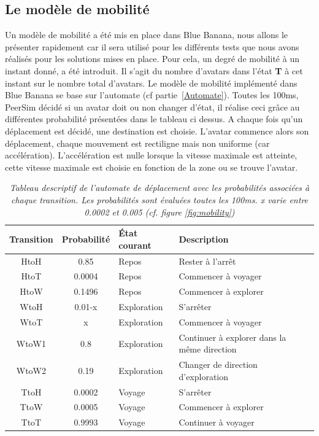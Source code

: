 \subsection{Le modèle de mobilité}

Un modèle de mobilité a été mis en place dans Blue Banana, nous allons le présenter rapidement car il sera utilisé pour les différents tests que nous avons réalisés pour les solutions mises en place. Pour cela, un degré de mobilité à un instant donné, a été introduit. Il s'agit du nombre d'avatars dans l'état \textbf{T} à cet instant sur le nombre total d'avatars. Le modèle de mobilité implémenté dans Blue Banana se base sur l'automate (cf partie~\ref{Automate}). Toutes les 100ms, PeerSim décidé si un avatar doit ou non changer d'état, il réalise ceci grâce au différentes probabilité présentées dans le tableau ci dessus. A chaque fois qu'un déplacement est décidé, une destination est choisie. L'avatar commence alors son déplacement, chaque mouvement est rectiligne mais non uniforme (car accélération). L'accélération est nulle lorsque la vitesse maximale est atteinte, cette vitesse maximale est choisie en fonction de la zone ou se trouve l'avatar.

\begin{table}
  \begin{center}
    \begin{tabular}{|c|c|l|l|}
      \hline
      Transition & Probabilité & État courant & Description\\
      \hline
      HtoH & 0.85 & Repos & Rester à l'arrêt\\
      HtoT & 0.0004 & Repos & Commencer à voyager\\
      HtoW & 0.1496 & Repos & Commencer à explorer\\
      WtoH & 0.01-x & Exploration & S'arrêter\\
      WtoT & x & Exploration & Commencer à voyager\\
      WtoW1 & 0.8 & Exploration & Continuer à explorer dans la même direction\\
      WtoW2 & 0.19 & Exploration & Changer de direction d'exploration\\
      TtoH & 0.0002 & Voyage & S'arrêter\\
      TtoW & 0.0005 & Voyage & Commencer à explorer\\
      TtoT & 0.9993 & Voyage & Continuer à voyager\\
      \hline
    \end{tabular}
  \end{center}
  \label{tab:automate}
  \caption{\textit{\small Tableau descriptif de l'automate de
      déplacement avec les probabilités associées à chaque
      transition. Les probabilités sont évaluées toutes les 100ms. x
      varie entre 0.0002 et 0.005 (cf. figure \ref{fig:mobility})}}
\end{table}

